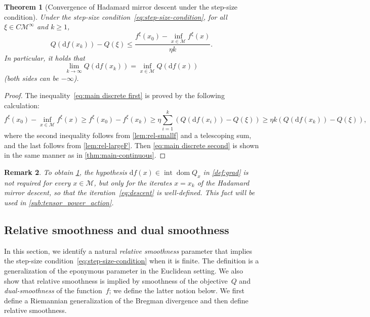 \documentclass[11pt,letterpaper]{article}
\newtheorem{theorem}{Theorem}[section]
\newtheorem{remark}[theorem]{Remark}\AddToHook{env/remark/begin}{\crefalias{theorem}{remark}}
\numberwithin{equation}{section}
\newcommand{\diff}{\mathrm{d}}
\newcommand{\MM}{\mathcal{M}}
\DeclareMathOperator{\intr}{int}
\DeclareMathOperator{\dom}{dom}
\begin{document}
\begin{theorem}[Convergence of Hadamard mirror descent under the step-size condition]
\label{thm:main-discrete}
    Under the step-size condition~\eqref{eq:step-size-condition}, for all $\xi \in C\MM^\infty$ and $k\geq1$,
    \begin{equation}\label{eq:main discrete first}
        Q(\diff f(x_k)) - Q(\xi) \le \frac{f^\xi(x_0) - \inf_{x \in \MM} f^\xi(x)}{\eta k}.
    \end{equation}
    In particular, it holds that
    \begin{equation}\label{eq:main discrete second}
        \lim_{k \to \infty}Q(\diff f(x_k)) = \inf_{x \in \MM}Q(\diff f(x))
    \end{equation}
    (both sides can be $-\infty$).
\end{theorem}
\begin{proof}
    The inequality~\eqref{eq:main discrete first} is proved by the following calculation:
    \[
        f^\xi(x_0) - \inf_{x \in \MM} f^\xi(x) \ge f^\xi(x_0) - f^\xi(x_k) \ge \eta\sum_{i = 1}^k\left(Q(\diff f(x_i)) - Q(\xi)\right) \ge \eta k\left(Q(\diff f(x_k)) - Q(\xi)\right),
    \]
    where the second inequality follows from \cref{lem:rel-smallf} and a telescoping sum, and the last follows from \cref{lem:rel-largeF}.
    Then \cref{eq:main discrete second} is shown in the same manner as in \cref{thm:main-continuous}.
\end{proof}

\begin{remark}\label{rem:hypothesis}
    To obtain \cref{thm:main-discrete}, the hypothesis $\diff f(x) \in \intr\dom Q_x$ in \cref{def:grad} is not required for every $x \in \MM$, but only for the iterates $x = x_k$ of the Hadamard mirror descent, so that the iteration~\eqref{eq:descent} is well-defined.
    This fact will be used in \cref{sub:tensor_power_action}.
\end{remark}

\subsection{Relative smoothness and dual smoothness}\label{sub:rel-smooth}
In this section, we identify a natural \emph{relative smoothness} parameter that implies the step-size condition~\eqref{eq:step-size-condition} when it is finite.
The definition is a generalization of the eponymous parameter in the Euclidean setting.
We also show that relative smoothness is implied by smoothness of the objective~$Q$ and \emph{dual-smoothness} of the function~$f$; we define the latter notion below.
We first define a Riemannian generalization of the Bregman divergence and then define relative smoothness.
\end{document}
